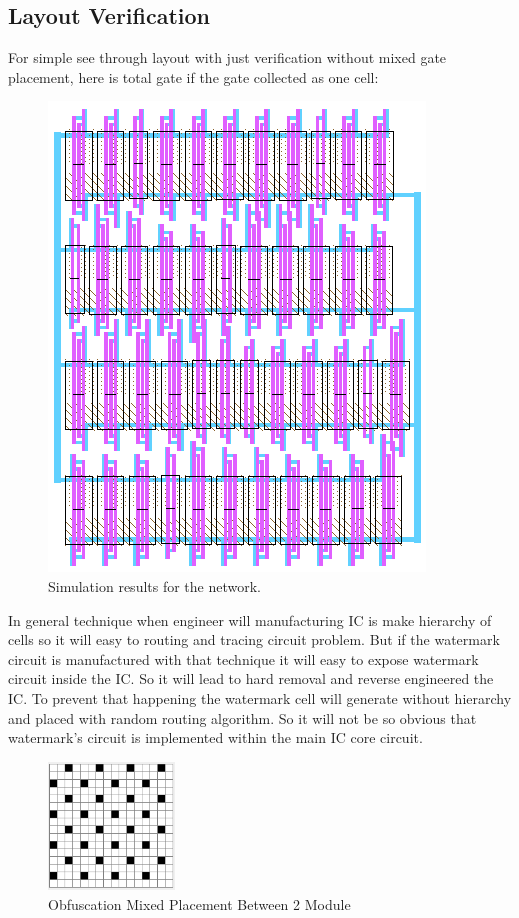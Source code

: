 \documentclass[10pt,journal,compsoc,letterpaper,final]{IEEEtran}
\begin{document}
\subsection{Layout Verification}
For simple see through layout with just verification without mixed gate placement, here is total gate if the gate collected as one cell:
\begin{figure}[h]
	\centering
	\includegraphics[scale=0.7]{images/gate1}
	\caption{Simulation results for the network.}
	\label{fig_sim}
\end{figure}

In general technique when engineer will manufacturing IC is make hierarchy of cells so it will easy to routing and tracing circuit problem. But if the watermark circuit is manufactured with that technique it will easy to expose watermark circuit inside the IC. So it will lead to hard removal and reverse engineered the IC. To prevent that happening the watermark cell will generate without hierarchy and placed with random routing algorithm. So it will not be so obvious that watermark’s circuit is implemented within the main IC core circuit.

\begin{figure}
	\centering
	\includegraphics[width=0.3\textwidth]
	{images/gatePlace.PNG}
	\caption{Obfuscation Mixed Placement Between 2 Module}
	\label{mobf}
\end{figure}
\end{document}
